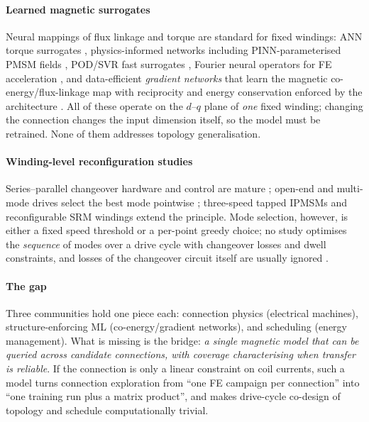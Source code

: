 \documentclass[review]{elsarticle}
\begin{document}
\paragraph{Learned magnetic surrogates}
Neural mappings of flux linkage and torque are standard for fixed windings:
ANN torque surrogates \cite{Access2020ANNReview}, physics-informed
networks \cite{Raissi2019PINN} including PINN-parameterised PMSM
fields \cite{TEC2025PINN}, POD/SVR fast surrogates \cite{Arxiv2024POD},
Fourier neural operators \cite{Li2021FNO} for FE acceleration
\cite{DETC2025FNO}, and
data-efficient \emph{gradient networks} that learn the magnetic
co-energy/flux-linkage map with reciprocity and energy conservation enforced
by the architecture \cite{Li2026GradNet}. All of these operate on the
$d$--$q$ plane of \emph{one} fixed winding; changing the connection changes
the input dimension itself, so the model must be retrained. None of them
addresses topology generalisation.

\paragraph{Winding-level reconfiguration studies}
Series--parallel changeover hardware and control are mature
\cite{Shin2024WEVJ, TIA2024MechChangeover, IPEC2014}; open-end
and multi-mode drives select the best mode pointwise \cite{Cha2024Math};
three-speed tapped IPMSMs \cite{TIE2026Tap} and reconfigurable SRM windings
\cite{TTE2025SRM} extend the principle. Mode selection, however, is either a
fixed speed threshold or a per-point greedy choice; no study optimises the
\emph{sequence} of modes over a drive cycle with changeover losses and dwell
constraints, and losses of the changeover circuit itself are usually ignored
\cite{Best2025Access}.

\paragraph{The gap}
Three communities hold one piece each: connection physics (electrical
machines), structure-enforcing ML (co-energy/gradient networks), and
scheduling (energy management). What is missing is the bridge:
\emph{a single magnetic model that can be queried across candidate
connections, with coverage characterising when transfer is reliable}. If the
connection is only a linear constraint on coil currents, such a model turns
connection exploration from ``one FE campaign per connection'' into ``one
training run plus a matrix product'', and makes drive-cycle co-design of
topology and schedule computationally trivial.
\end{document}

